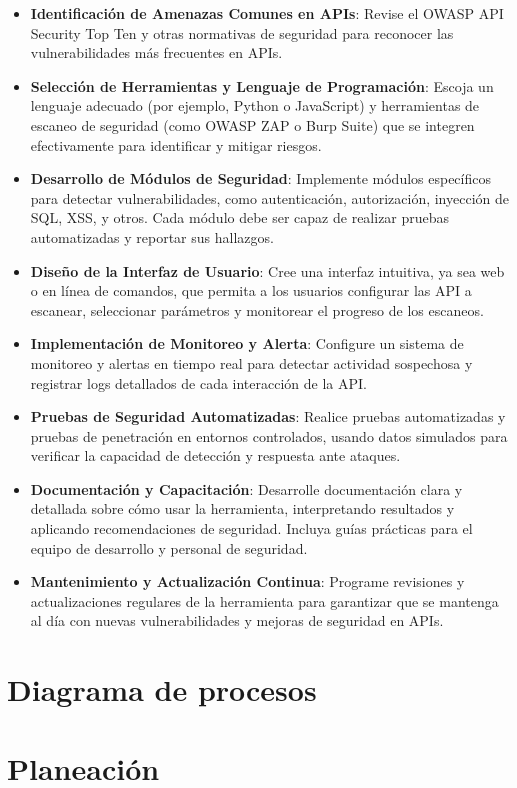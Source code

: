 \documentclass{article}
\begin{document}
    \begin{itemize}
        \item \textbf{Identificación de Amenazas Comunes en APIs}: Revise el OWASP API Security Top Ten y otras normativas de seguridad para reconocer las vulnerabilidades más frecuentes en APIs.
        \item \textbf{Selección de Herramientas y Lenguaje de Programación}: Escoja un lenguaje adecuado (por ejemplo, Python o JavaScript) y herramientas de escaneo de seguridad (como OWASP ZAP o Burp Suite) que se integren efectivamente para identificar y mitigar riesgos.
        \item \textbf{Desarrollo de Módulos de Seguridad}: Implemente módulos específicos para detectar vulnerabilidades, como autenticación, autorización, inyección de SQL, XSS, y otros. Cada módulo debe ser capaz de realizar pruebas automatizadas y reportar sus hallazgos.
        \item \textbf{Diseño de la Interfaz de Usuario}: Cree una interfaz intuitiva, ya sea web o en línea de comandos, que permita a los usuarios configurar las API a escanear, seleccionar parámetros y monitorear el progreso de los escaneos.
        \item \textbf{Implementación de Monitoreo y Alerta}: Configure un sistema de monitoreo y alertas en tiempo real para detectar actividad sospechosa y registrar logs detallados de cada interacción de la API.
        \item \textbf{Pruebas de Seguridad Automatizadas}: Realice pruebas automatizadas y pruebas de penetración en entornos controlados, usando datos simulados para verificar la capacidad de detección y respuesta ante ataques.
        \item \textbf{Documentación y Capacitación}: Desarrolle documentación clara y detallada sobre cómo usar la herramienta, interpretando resultados y aplicando recomendaciones de seguridad. Incluya guías prácticas para el equipo de desarrollo y personal de seguridad.
        \item \textbf{Mantenimiento y Actualización Continua}: Programe revisiones y actualizaciones regulares de la herramienta para garantizar que se mantenga al día con nuevas vulnerabilidades y mejoras de seguridad en APIs.        
    \end{itemize}
    \section{Diagrama de procesos}
    \section{Planeación}
\end{document}
